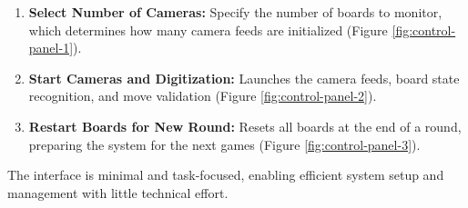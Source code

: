 \begin{enumerate}
\item \textbf{Select Number of Cameras:} Specify the number of boards to monitor, which determines how many camera feeds are initialized (Figure \ref{fig:control-panel-1}).
\item \textbf{Start Cameras and Digitization:} Launches the camera feeds, board state recognition, and move validation (Figure \ref{fig:control-panel-2}).
\item \textbf{Restart Boards for New Round:} Resets all boards at the end of a round, preparing the system for the next games (Figure \ref{fig:control-panel-3}).
\end{enumerate}

The interface is minimal and task-focused, enabling efficient system setup and management with little technical effort.


